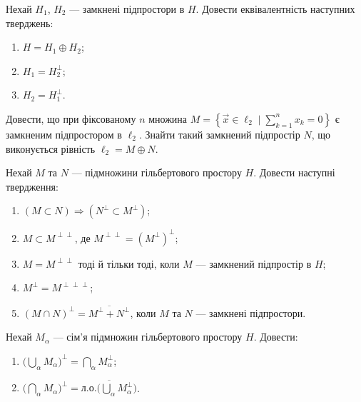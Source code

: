 
\begin{exercise}\label{N:1_2_16}
    Нехай $H_1$, $H_2$ --- замкнені підпростори в $H$.
    Довести еквівалентність наступних тверджень:
    \begin{enumerate}[label=\ukr*)]
        \item $H = H_1 \oplus H_2$;
        \item $H_1 = H_2^\perp $;
        \item $H_2 = H_1^\perp $.
    \end{enumerate}
\end{exercise}

\begin{exercise}
    Довести, що при фіксованому $n$ множина $M = \left\{ \vec{x} \in \ell_2
    \mid \sum\limits^n_{k=1} x_k=0 \right\}$ є замкненим підпростором в $\ell_2$.
    Знайти такий замкнений підпростір $N$, що виконується рівність $\ell_2 = M \oplus N$.
\end{exercise}

\begin{exercise}\label{N:1_2_18}
    Нехай $M$ та $N$ --- підмножини гільбертового простору $H$. Довести наступні твердження:
    \begin{enumerate}[label=\ukr*)]
        \item $(M \subset N) \Rightarrow (N^\perp \subset M^\perp)$;
        \item $M \subset M^{\perp\perp}$, де $M^{\perp\perp}={(M^\perp)}^\perp$;
        \item $M = M^{\perp\perp}$ тоді й тільки тоді, коли $M$ ---
              замкнений підпростір в $H$;
        \item $M^\perp = M^{\perp\perp\perp}$;
        \item $(M \cap N)^\perp = \overline{M^\perp + N^\perp}$, коли $M$ та $N$ --- замкнені підпростори.
    \end{enumerate}
\end{exercise}

\begin{exercise}
    Нехай $M_\alpha$ --- сім'я підмножин гільбертового простору $H$. Довести:
    \begin{enumerate}[label=\ukr*)]
        \item $\Big( \bigcup\limits_\alpha M_\alpha \Big)^\perp = 
              \bigcap\limits_\alpha M_\alpha^\perp$;
        \item $\Big( \bigcap\limits_\alpha M_\alpha \Big)^\perp = 
              \overline{\text{л.о.}\Big(\bigcup\limits_\alpha M_\alpha^\perp\Big)}$.
    \end{enumerate}
\end{exercise}

